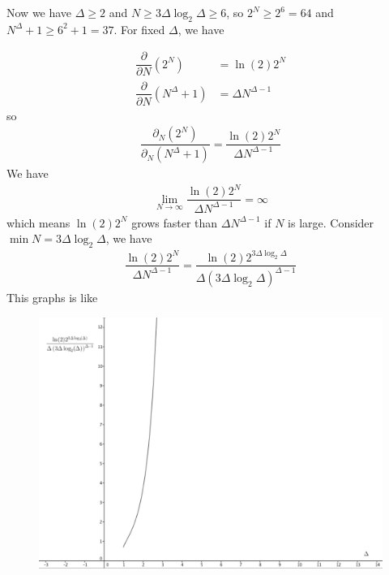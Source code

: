 \documentclass[12pt]{article}
\newcommand{\ParTh}[1]{\left(#1\right)}
\begin{document}
Now we have $\Delta\geq2$ and $N\geq3\Delta\log_2\Delta\geq6$, so $2^N\geq2^6=64$ and $N^\Delta+1\geq6^2+1=37$. For fixed $\Delta$, we have

\begin{align}
\dfrac{\partial}{\partial N}\ParTh{2^{N}}&=\ln\ParTh{2}2^{N}\\
\dfrac{\partial}{\partial N}\ParTh{N^\Delta+1}&=\Delta N^{\Delta-1}
\end{align}
so
\begin{align}
\dfrac{\partial_N\ParTh{2^{N}}}{\partial_N\ParTh{N^\Delta+1}}=\dfrac{\ln\ParTh{2}2^N}{\Delta N^{\Delta-1}}%
\end{align}
We have
\begin{align}
\lim\limits_{N\rightarrow\infty}\dfrac{\ln\ParTh{2}2^N}{\Delta N^{\Delta-1}}=\infty
\end{align}
which means $\ln\ParTh{2}2^N$ grows faster than $\Delta N^{\Delta-1}$ if $N$ is large. Consider $\min N=3\Delta\log_2\Delta$, we have
\begin{align}
\dfrac{\ln\ParTh{2}2^N}{\Delta N^{\Delta-1}}=\dfrac{\ln\ParTh{2}2^{3\Delta\log_2\Delta}}{\Delta\ParTh{3\Delta\log_2\Delta}^{\Delta-1}}
\end{align}
This graphs is like
\begin{figure}[H]
	\centering
	\includegraphics[scale=0.4]{21-1.png}
\end{figure}
\end{document}

